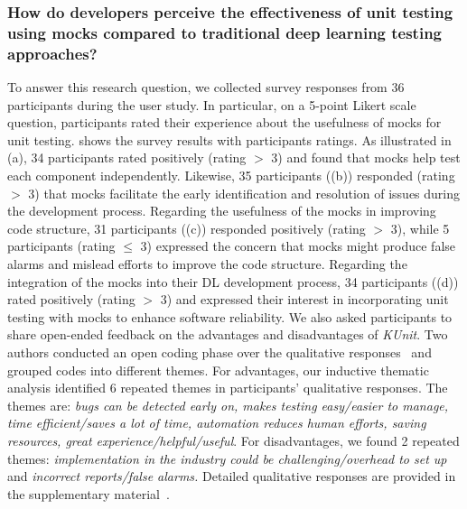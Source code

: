 \subsubsection{How do developers perceive the effectiveness of unit testing using mocks compared to traditional deep learning testing approaches?}
To answer this research question, we collected survey responses from 36 participants during the user study.
In particular, on a 5-point Likert scale question, participants rated their experience about the usefulness of mocks for unit testing.
 shows the survey results with participants ratings.
As illustrated in (a), 34 participants rated positively (rating $>$ 3) and found that mocks help test each component independently.
Likewise, 35 participants ((b)) responded (rating $>$ 3)  that mocks facilitate the early identification and resolution of issues during the development process.
Regarding the usefulness of the mocks in improving code structure, 31 participants ((c)) responded positively (rating $>$ 3), while 5 participants (rating $\leq$ 3) 
expressed the concern that mocks might produce false alarms and mislead efforts to improve the code structure.
Regarding the integration of the mocks into their DL development process, 34 participants ((d)) rated positively (rating $>$ 3) and expressed their interest in incorporating unit testing with mocks to enhance software reliability.
We also asked participants to share open-ended feedback on the advantages and disadvantages of {\em KUnit}.
Two authors conducted an open coding phase over the qualitative responses~\cite{weiss1995learning} and grouped codes into different themes.
For advantages, our 
inductive thematic analysis identified 6 repeated themes in participants' qualitative responses.
The themes are: \textit{bugs can be detected early on, makes testing easy/easier to manage, time efficient/saves a lot of time, automation reduces human efforts, saving resources, great experience/helpful/useful}. 
For disadvantages, we found 2 repeated themes: 
\textit{implementation in the industry could be challenging/overhead to set up} and \textit{incorrect reports/false alarms.} 
Detailed qualitative responses are provided in the supplementary material~\cite{participantsresponse}. 

